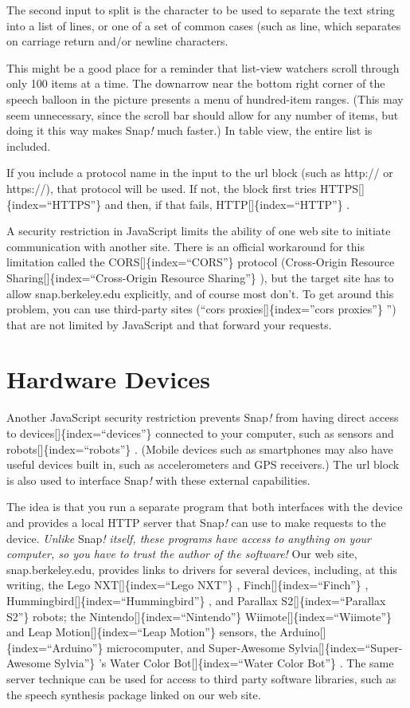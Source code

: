 \documentclass[
  letterpaper,
]{book}
\begin{document}
The second input to split is the character to be used to separate the
text string into a list of lines, or one of a set of common cases (such
as line, which separates on carriage return and/or newline characters.

This might be a good place for a reminder that list-view watchers scroll
through only 100 items at a time. The downarrow near the bottom right
corner of the speech balloon in the picture presents a menu of
hundred-item ranges. (This may seem unnecessary, since the scroll bar
should allow for any number of items, but doing it this way makes
Snap\emph{!} much faster.) In table view, the entire list is included.

If you include a protocol name in the input to the url block (such as
http:// or https://), that protocol will be used. If not, the block
first tries HTTPS{[}{]}\{index=``HTTPS''\} and then, if that fails,
HTTP{[}{]}\{index=``HTTP''\} .

A security restriction in JavaScript limits the ability of one web site
to initiate communication with another site. There is an official
workaround for this limitation called the CORS{[}{]}\{index=``CORS''\}
protocol (Cross-Origin Resource Sharing{[}{]}\{index=``Cross-Origin
Resource Sharing''\} ), but the target site has to allow
snap.berkeley.edu explicitly, and of course most don't. To get around
this problem, you can use third-party sites (``cors
proxies{[}{]}\{index=''cors proxies''\} '') that are not limited by
JavaScript and that forward your requests.

\section{Hardware Devices}\label{hardware-devices}

Another JavaScript security restriction prevents Snap\emph{!} from
having direct access to devices{[}{]}\{index=``devices''\} connected to
your computer, such as sensors and robots{[}{]}\{index=``robots''\} .
(Mobile devices such as smartphones may also have useful devices built
in, such as accelerometers and GPS receivers.) The url block is also
used to interface Snap\emph{!} with these external capabilities.

The idea is that you run a separate program that both interfaces with
the device and provides a local HTTP server that Snap\emph{!} can use to
make requests to the device. \emph{Unlike} Snap\emph{!} \emph{itself,
these programs have access to anything on your computer, so you have to
trust the author of the software!} Our web site, snap.berkeley.edu,
provides links to drivers for several devices, including, at this
writing, the Lego NXT{[}{]}\{index=``Lego NXT''\} ,
Finch{[}{]}\{index=``Finch''\} ,
Hummingbird{[}{]}\{index=``Hummingbird''\} , and Parallax
S2{[}{]}\{index=``Parallax S2''\} robots; the
Nintendo{[}{]}\{index=``Nintendo''\} Wiimote{[}{]}\{index=``Wiimote''\}
and Leap Motion{[}{]}\{index=``Leap Motion''\} sensors, the
Arduino{[}{]}\{index=``Arduino''\} microcomputer, and Super-Awesome
Sylvia{[}{]}\{index=``Super-Awesome Sylvia''\} 's Water Color
Bot{[}{]}\{index=``Water Color Bot''\} . The same server technique can
be used for access to third party software libraries, such as the speech
synthesis package linked on our web site.
\end{document}
